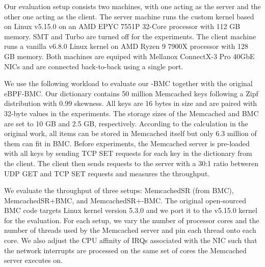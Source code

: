 Our evaluation setup consists two machines, with one
    acting as the server and the other one acting as the client.
The server machine runs the \projname{} custom kernel based on Linux v5.15.0 on
    an AMD EPYC 7551P 32-Core processor with 112 GB memory.
SMT and Turbo are turned off for the experiments.
The client machine runs a vanilla v6.8.0 Linux kernel on AMD Ryzen 9 7900X
    processor with 128 GB memory.
Both machines are equiped with Mellanox ConnectX-3 Pro 40GbE NICs and are
    connected back-to-back using a single port.


We use the following workload to evaluate our \projname{}-BMC together with the
    original eBPF-BMC.
Our dictionary contains 50 million Memcached keys following a Zipf
    distribution with 0.99 skewness.
All keys are 16 bytes in size and are paired with 32-byte values in the
    experiments.
The storage sizes of the Memcached and BMC are set to 10 GB and 2.5 GB,
    respectively.
According to the calculation in the original work, all items
    can be stored in Memcached itself but only 6.3 million of them can fit in
    BMC.
Before experiments, the Memcached server is pre-loaded with all keys by
    sending TCP SET requests for each key in the dictionary from the client.
The client then sends requests to the server with a 30:1 ratio betweren UDP GET and
    TCP SET requests and measures the throughput.

We evaluate the throughput of three setups: MemcachedSR (from BMC),
    MemcachedSR+BMC, and MemcachedSR+\projname{}-BMC.
The original open-sourced BMC code targets Linux kernel version 5.3.0 and we
    port it to the v5.15.0 \projname{} kernel for the evaluation.
For each setup, we vary the number of processor cores and the number of threads
    used by the Memcached server and pin each thread onto each core.
We also adjust the CPU affinity of IRQs associated with the NIC such that the
    network interrupts are processed on the same set of cores the Memcached
    server executes on.

